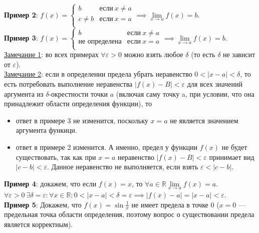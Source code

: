 \documentclass{article}
\begin{document}
    \textbf{Пример 2}: \(f(x) =
    \begin{cases}
        b & \text{если}\ x \neq a\\
        c \neq b & \text{если}\ x = a\\ 
    \end{cases} \implies \lim\limits_{x \to a}f(x) = b\).\\
    \textbf{Пример 3}: \(f(x) = 
    \begin{cases}
        b & \text{если}\ x \neq a\\
        \text{не определена} & \text{если}\ x = a\\
    \end{cases} \implies \lim\limits_{x \to a}f(x) = b\).\\
    \underline{Замечание 1}: во всех примерах \(\forall \varepsilon > 0\) можно взять любое \(\delta\)  (то есть \(\delta\) не зависит от \(\varepsilon\)).\\
    \underline{Замечание 2}: если в определении предела убрать неравенство \(0 < |x - a| < \delta\), то есть потребовать выполнение неравенства \(|f(x) - B| < \varepsilon\)
    для всех значений аргумента из \(\delta\)-окрестности точки \(a\) (включая саму точку a, при условии, что она принадлежит области определения функции), то 
    \begin{itemize}
        \item ответ в примере 3 не изменится, поскольку \(x = a\) не является значением аргумента функици.
        \item ответ в примере 2 изменится. А именно, предел у функции \(f(x)\) не будет существовать, так как при \(x = a\) неравенство \(|f(x) - B| < \varepsilon\) принимает вид \(|c - b| < \varepsilon\). Данное неравенство не выполняется, если взять \(\varepsilon < |c - b|\).
    \end{itemize}
    \textbf{Пример 4}: докажем, что если \(f(x) = x\), то \(\forall a \in \mathbb{R} \lim\limits_{x \to a}f(x) = a\).
    \(\forall \varepsilon > 0\ \exists \delta = \varepsilon: \forall x \in \mathbb{R}: 0 < |x - a| < \delta = \varepsilon \implies |f(x) - a| = |x - a| < \varepsilon\).\\
    \textbf{Пример 5}: Докажем, что \(f(x) = \sin{\frac{1}{x}}\) не имеет предела в точке 0 (\(x = 0\) --- предельная точка области определения, поэтому вопрос о существовании предела является корректным).
\end{document}
